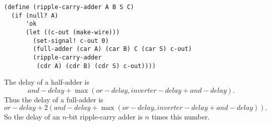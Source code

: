 \documentclass[a4paper,12pt]{article}
\begin{document}
\begin{lstlisting}
(define (ripple-carry-adder A B S C)
  (if (null? A)
      'ok
      (let ((c-out (make-wire)))
        (set-signal! c-out 0)
        (full-adder (car A) (car B) C (car S) c-out)
        (ripple-carry-adder
         (cdr A) (cdr B) (cdr S) c-out))))
\end{lstlisting}
The delay of a half-adder is
\[and-delay + \max(or-delay, inverter-delay + and-delay).\]
Thus the delay of a full-adder is
\[ or-delay + 2(and-delay + \max(or-delay, inverter-delay +
and-delay)).\]
So the delay of an $n$-bit ripple-carry adder is $n$ times this number.
\end{document}
